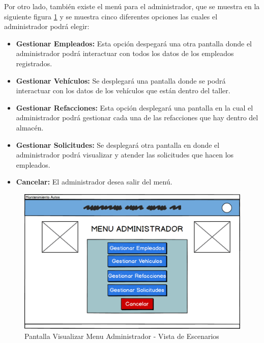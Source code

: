 Por otro lado, también existe el menú para el administrador, que se muestra en la siguiente figura \ref{fig:Pantalla Visualizar Menu Administrador - Vista de Escenarios} y se muestra cinco diferentes opciones las cuales el administrador podrá elegir:
\begin{itemize}
	\item \textbf{Gestionar Empleados:} Esta opción despegará una otra pantalla donde el administrador podrá interactuar con todos los datos de los empleados registrados.
	\item \textbf{Gestionar Vehículos:} Se desplegará una pantalla donde se podrá interactuar con los datos de los vehículos que están dentro del taller.
	\item \textbf{Gestionar Refacciones:} Esta opción desplegará una pantalla en la cual el administrador podrá gestionar cada una de las refacciones que hay dentro del almacén.
	\item \textbf{Gestionar Solicitudes:} Se desplegará otra pantalla en donde el administrador podrá visualizar y atender las solicitudes que hacen los empleados.
	\item \textbf{Cancelar:} El administrador desea salir del menú.
\end{itemize}
\begin{figure}[!h]
	\centering
	\includegraphics[width=1\textwidth]{./diseno/vescenarios/imagenes/VisualizarMenuAdmin}
	\caption{Pantalla Visualizar Menu Administrador - Vista de Escenarios}
	\label{fig:Pantalla Visualizar Menu Administrador - Vista de Escenarios}
\end{figure}
\clearpage